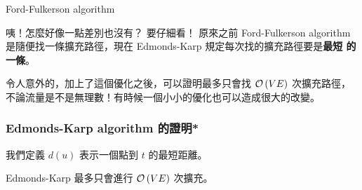 \documentclass[a4paper,12pt]{book}
\begin{document}
\begin{algorithm}[H]
  \DontPrintSemicolon
  \caption{Ford-Fulkerson algorithm}\label{euclid}
  \myalg{\FF{}} {
}
\end{algorithm}
咦！怎麼好像一點差別也沒有？ 要仔細看！ 原來之前 Ford-Fulkerson algorithm
是隨便找一條擴充路徑，現在 Edmonds-Karp 規定每次找的擴充路徑要是{\bf 最短
  的一條}。

令人意外的，加上了這個優化之後，可以證明最多只會找 $\operatorname{\mathcal{O}}\left(VE\right)$ 次擴充路徑，
不論流量是不是無理數！有時候一個小小的優化也可以造成很大的改變。

\subsubsection{Edmonds-Karp algorithm 的證明*}
\begin{definition}
  我們定義 $d(u)$ 表示一個點到 $t$ 的最短距離。
\end{definition}
\begin{simthm}
  Edmonds-Karp 最多只會進行 $\operatorname{\mathcal{O}}\left(VE\right)$ 次擴充。
\end{simthm}
\end{document}
